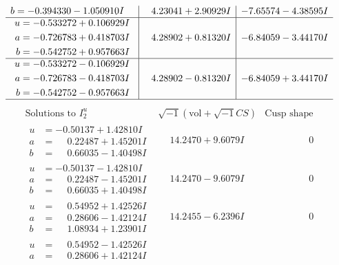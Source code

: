 \documentclass[1p]{elsarticle_modified}
\theoremstyle{definition}
\newcommand{\I}{\sqrt{-1}}
\begin{document}
$$\begin{array}{c|c|c}
\begin{aligned}
b &= -0.394330 - 1.050910 I\end{aligned}
 & \phantom{-}4.23041 + 2.90929 I & -7.65574 - 4.38595 I \\ \hline\begin{aligned}
u &= -0.533272 + 0.106929 I \\
a &= -0.726783 + 0.418703 I \\
b &= -0.542752 + 0.957663 I\end{aligned}
 & \phantom{-}4.28902 + 0.81320 I & -6.84059 - 3.44170 I \\ \hline\begin{aligned}
u &= -0.533272 - 0.106929 I \\
a &= -0.726783 - 0.418703 I \\
b &= -0.542752 - 0.957663 I\end{aligned}
 & \phantom{-}4.28902 - 0.81320 I & -6.84059 + 3.44170 I\\
 \hline 
 \end{array}$$\newpage$$\begin{array}{c|c|c}  
\text{Solutions to }I^u_{2}& \I (\text{vol} + \sqrt{-1}CS) & \text{Cusp shape}\\
 \hline 
\begin{aligned}
u &= -0.50137 + 1.42810 I \\
a &= \phantom{-}0.22487 + 1.45201 I \\
b &= \phantom{-}0.66035 - 1.40498 I\end{aligned}
 & \phantom{-}14.2470 + 9.6079 I & \phantom{-0.000000 } 0 \\ \hline\begin{aligned}
u &= -0.50137 - 1.42810 I \\
a &= \phantom{-}0.22487 - 1.45201 I \\
b &= \phantom{-}0.66035 + 1.40498 I\end{aligned}
 & \phantom{-}14.2470 - 9.6079 I & \phantom{-0.000000 } 0 \\ \hline\begin{aligned}
u &= \phantom{-}0.54952 + 1.42526 I \\
a &= \phantom{-}0.28606 - 1.42124 I \\
b &= \phantom{-}1.08934 + 1.23901 I\end{aligned}
 & \phantom{-}14.2455 - 6.2396 I & \phantom{-0.000000 } 0 \\ \hline\begin{aligned}
u &= \phantom{-}0.54952 - 1.42526 I \\
a &= \phantom{-}0.28606 + 1.42124 I \\

\end{aligned}
\end{array}$$
\end{document}
